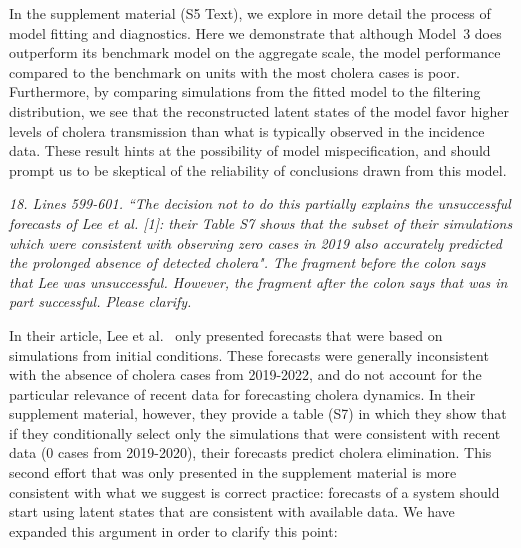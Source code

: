 \documentclass[11pt]{article}
\newcommand\report[1]{{\color{mygreen} \vspace{1mm}\hspace{0.25in}\parbox{6in}{\em #1}}}
\newcommand\article[1]{{\color{blue} \vspace{1mm}\hspace{0.25in}\parbox{6in}{\em #1}}}
\begin{document}


In the supplement material (S5 Text), we explore in more detail the process of model fitting and diagnostics. Here we demonstrate that although Model~3 does outperform its benchmark model on the aggregate scale, the model performance compared to the benchmark on units with the most cholera cases is poor. Furthermore, by comparing simulations from the fitted model to the filtering distribution, we see that the reconstructed latent states of the model favor higher levels of cholera transmission than what is typically observed in the incidence data.
These result hints at the possibility of model mispecification, and should prompt us to be skeptical of the reliability of conclusions drawn from this model.

\report{
  18. Lines 599-601. ``The decision not to do this partially explains the unsuccessful forecasts of Lee et al. [1]: their Table S7 shows that the subset of their simulations which were consistent with observing zero cases in 2019 also accurately predicted the prolonged absence of detected cholera". The fragment before the colon says that Lee was unsuccessful. However, the fragment after the colon says that was in part successful. Please clarify.
}

In their article, Lee et al.~\cite{lee20} only presented forecasts that were based on simulations from initial conditions. These forecasts were generally inconsistent with the absence of cholera cases from 2019-2022, and do not account for the particular relevance of recent data for forecasting cholera dynamics. In their supplement material, however, they provide a table (S7) in which they show that if they conditionally select only the simulations that were consistent with recent data (0 cases from 2019-2020), their forecasts predict cholera elimination. This second effort that was only presented in the supplement material is more consistent with what we suggest is correct practice: forecasts of a system should start using latent states that are consistent with available data. We have expanded this argument in order to clarify this point:

\article{\editForecastOne}

\article{\editForecastTwo}
\end{document}
